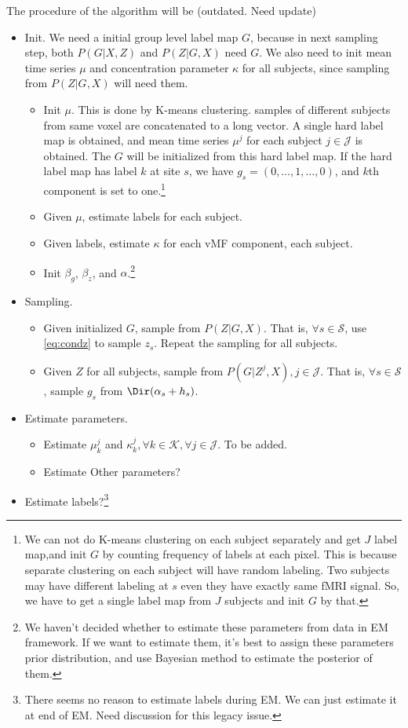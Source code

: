\documentclass{article}
\begin{document}
The procedure of the algorithm will be (outdated. Need update)
\begin{itemize}
  \item Init. We need a initial group level label map $G$, because in next sampling step, both $P(G|X, Z)$ and $P(Z|G, X)$ need $G$. We also need to init mean time series $\mu$ and concentration parameter $\kappa$ for all subjects, since sampling from $P(Z|G, X)$ will need them.
    \begin{itemize}
      \item Init $\mu$. This is done by K-means clustering. samples of different subjects from same voxel are concatenated to a long vector. A single hard label map is obtained, and mean time series $\mu^j$ for each subject $j\in \mathcal{J}$ is obtained. The $G$ will be  initialized from this hard label map. If the hard label map has label $k$ at site $s$, we have $g_s = (0, \dots, 1, \dots, 0)$, and $k$th component is set to one.\footnote{We can not do K-means clustering on each subject separately and get $J$ label map,and init $G$ by counting frequency of labels at each pixel. This is because separate clustering on each subject will have random labeling. Two subjects may have different labeling at $s$ even they have exactly same fMRI signal. So, we have to get a single label map from $J$ subjects and init $G$ by that.} 
      \item Given $\mu$, estimate labels for each subject. 
      \item Given labels, estimate $\kappa$ for each vMF component, each subject.
      \item Init $\beta_g$, $\beta_z$, and $\alpha$.\footnote{We haven't decided whether to estimate these parameters from data in EM framework. If we want to estimate them, it's best to assign these parameters prior distribution, and use Bayesian method to estimate the posterior of them.}
    \end{itemize}
  \item Sampling.
    \begin{itemize}
    \item Given initialized $G$, sample from $P(Z|G, X)$. That is, $\forall s\in \mathcal{S}$, use \eqref{eq:condz} to sample $z_s$. Repeat the sampling for all subjects.
    \item Given  $Z$ for all subjects, sample from $P(G|Z^j, X), j\in \mathcal{J}$. That is, $\forall s\in \mathcal{S}$, sample $g_s$ from $\Dir (\alpha_s + h_s)$.
      \end{itemize}
  \item Estimate parameters.
    \begin{itemize}
      \item Estimate $\mu_k^j$ and $\kappa_k^j, \forall k\in \mathcal{K}, \forall j \in \mathcal{J}$. To be added.
      \item Estimate Other parameters?
    \end{itemize}

    \item Estimate labels?\footnote{There seems no reason to estimate labels during EM. We can just estimate it at end of EM. Need discussion for this legacy issue.}
\end{itemize}
\end{document}
